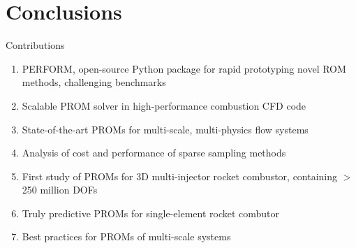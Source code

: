 \documentclass[]{beamer}
\begin{document}
\section*{Conclusions}

\begin{frame}{Contributions}
    \begin{enumerate}
		\item PERFORM, open-source Python package for rapid prototyping novel ROM methods, challenging benchmarks
		\item Scalable PROM solver in high-performance combustion CFD code
        \item State-of-the-art PROMs for multi-scale, multi-physics flow systems
        \item Analysis of cost and performance of sparse sampling methods
        \item First study of PROMs for 3D multi-injector rocket combustor, containing $>$ 250 million DOFs
        \item Truly predictive PROMs for single-element rocket combutor
        \item Best practices for PROMs of multi-scale systems
    \end{enumerate}
\end{frame}
\end{document}
